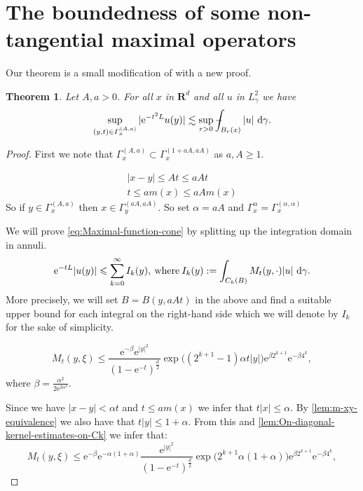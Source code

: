 \documentclass[a4paper,oneside,10pt]{amsproc}
\theoremstyle{plain}
\newtheorem{theorem}{Theorem}
\theoremstyle{remark}
\newcommand{\D}{\,\textup{d}}
\newcommand{\LHG}{{L^2_\gamma}}
\def\Xint#1{\mathchoice
  {\XXint\displaystyle\textstyle{#1}}%
  {\XXint\textstyle\scriptstyle{#1}}%
  {\XXint\scriptstyle\scriptscriptstyle{#1}}%
  {\XXint\scriptscriptstyle\scriptscriptstyle{#1}}%
  \!\int}
\def\XXint#1#2#3{{\setbox0=\hbox{$#1{#2#3}{\int}$ }
    \vcenter{\hbox{$#2#3$ }}\kern-.535\wd0}}
\def\dashint{\Xint-}
\renewcommand{\leq}{\leqslant}
\renewcommand{\leq}{\leqslant}
\renewcommand{\geq}{\geqslant}
\newcommand{\R}{\mathbf R}
\newcommand{\e}{\mathrm{e}} %
\renewcommand{\leq}{\leqslant}%
\renewcommand{\geq}{\geqslant}%
\begin{document}
\section{The boundedness of some non-tangential maximal operators}
Our theorem is a small modification of \cite[lemma 1.1]{Pineda2008} with a new proof.
\begin{theorem}\label{thm:Gaussian-maximal-function}
  Let $A, a > 0$. For all $x$ in $\R^d$ and all $u$ in $\LHG$ we have
  \begin{equation}
    \label{eq:Maximal-function-cone}
    \sup_{(y, t) \in \Gamma_x^{(A, a)}} |\e^{-t^2 L} u(y)| \lesssim
    \sup_{r > 0} \dashint_{B_r(x)} |u| \, \D\gamma.
  \end{equation}
\end{theorem}
\begin{proof}
  First we note that $\Gamma_x^{(A, a)} \subset \Gamma_x^{(1 + aA,
    aA)}$ as $a, A \geq 1$.

  \begin{align*}
    |x - y| \leq At \leq aA t\\
    t \leq a m(x) \leq aA m(x)
  \end{align*}
  So if $y \in \Gamma_x^{(A, a)}$ then $x \in \Gamma_y^{(aA, aA)}$. So
  set $\alpha = aA$ and $\Gamma_x^\alpha = \Gamma^{(\alpha, \alpha)}_x$


  We will prove \eqref{eq:Maximal-function-cone} by splitting up the
  integration domain in annuli.
  \begin{equation*}
    \e^{-t L} |u(y)| \leq \sum_{k = 0}^\infty I_k(y),
    \:\text{where}\: I_k(y) := \int_{C_k(B)} M_t(y, \cdot) |u|
    \,\D\gamma.
  \end{equation*}
  More precisely, we will set $B = B(y, aAt)$ in the above and find a
  suitable upper bound for each integral on the right-hand side which
  we will denote by $I_k$ for the sake of simplicity.


  \begin{equation*}
    M_t(y, \xi) \leq \frac{\e^{-\beta} \e^{|y|^2}}{(1 - \e^{-t})^{\frac{d}2}}
    \exp\bigl((2^{k + 1} - 1) \alpha t |y| \bigr) \e^{\beta 2^{k + 1}} \e^{-\beta 4^k},
  \end{equation*}
  where $\beta = \frac{\alpha^2}{2 \e^{2\alpha^2}}$.

  Since we have $|x - y| <  \alpha t$ and $t \leq a m(x)$ we infer that $t
  |x| \leq \alpha$. By \autoref{lem:m-xy-equivalence} we also have that $t
  |y| \leq 1 + \alpha$. From this and
  \autoref{lem:On-diagonal-kernel-estimates-on-Ck} we infer that:
  \begin{equation}
    \label{eq:Mehler-kernel-estimate-one-sided-bound-1}
    M_t(y, \xi) \leq \e^{-\beta} \e^{-\alpha(1 + \alpha)} \frac{\e^{|y|^2}}{(1 - \e^{-t})^{\frac{d}2}}
     \exp\bigl(2^{k + 1} \alpha (1 + \alpha) \bigr) \e^{\beta 2^{k + 1}} \e^{-\beta 4^k},
  \end{equation}


\end{proof}
\end{document}
